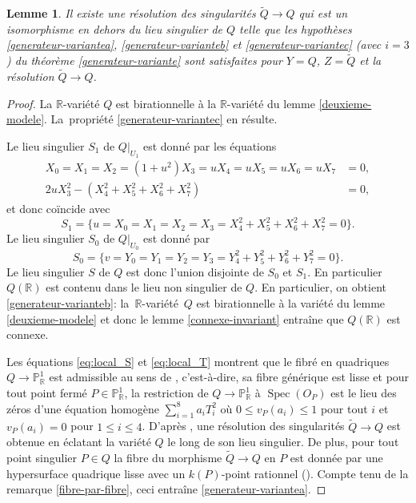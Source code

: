 \documentclass[JEP,XML,SOM,Unicode,francais,published]{cedram}
\newtheorem{lemma}[thm]{Lemme}
\theoremstyle{definition}
\newcommand{\R}{\mathbb R}
\renewcommand{\P}{\mathbb P}
\newcommand{\Spec}{\operatorname{Spec}}
\begin{document}
\begin{lemma}\label{fibration-quadriques-a-c}
Il existe une résolution des singularités $\tilde{Q}\to Q$ qui est un isomorphisme en dehors du lieu singulier de $Q$ telle que les hypothèses \eqref{generateur-variantea}, \eqref{generateur-varianteb} et \eqref{generateur-variantec} (avec $i=3$) du théorème \ref{generateur-variante} sont satisfaites pour $Y=Q$, $Z=\tilde{Q}$ et la résolution $\tilde{Q}\to Q$.
\end{lemma}

\begin{proof}
La $\R$-variété $Q$ est birationnelle à la $\R$-variété du lemme \ref{deuxieme-modele}. La~propriété \eqref{generateur-variantec} en résulte.

Le lieu singulier $S_1$ de $Q|_{U_1}$ est donné par les équations
\begin{align*}
X_0=X_1=X_2=(1+u^2)X_3=uX_4=uX_5=uX_6=uX_7&=0, \\
2uX_3^2-(X_4^2+X_5^2+X_6^2+X_7^2)&=0,
\end{align*}
et donc coïncide avec
\[S_1=\{u=X_0=X_1=X_2=X_3=X_4^2+X_5^2+X_6^2+X_7^2=0\}.\]
Le lieu singulier $S_0$ de $Q|_{U_0}$ est donné par
\[S_0=\{v=Y_0=Y_1=Y_2=Y_3=Y_4^2+Y_5^2+Y_6^2+Y_7^2=0\}.\]
Le lieu singulier $S$ de $Q$ est donc l'union disjointe de $S_0$ et $S_1$. En particulier $Q(\R)$ est contenu dans le lieu non singulier de $Q$. En particulier, on obtient \eqref{generateur-varianteb}: la~$\R$\nobreakdash-variété~$Q$ est birationnelle à la variété du lemme \ref{deuxieme-modele} et donc le lemme \ref{connexe-invariant} entraîne que $Q(\R)$ est connexe.

Les équations \eqref{eq:local_S} et \eqref{eq:local_T} montrent que le fibré en quadriques $Q\to \P^1_\R$ est admissible au sens de \cite[Déf.\,3.1]{colliot1993groupe}, c'est-à-dire, sa fibre générique est lisse et pour tout point fermé $P\in \P^1_\R$, la restriction de $Q\to \P^1_\R$ à $\Spec(O_P)$ est le lieu des zéros d'une équation homogène $\sum_{i=1}^8 a_iT_i^2$ où $0\leq v_P(a_i)\leq 1$ pour tout $i$ et $v_P(a_i)=0$ pour $1\leq i\leq 4$. D'après \cite[Th.\,3.3(a)]{colliot1993groupe}, une résolution des singularités $\tilde{Q}\to Q$ est obtenue en éclatant la variété $Q$ le long de son lieu singulier. De plus, pour tout point singulier $P\in Q$ la fibre du morphisme $\tilde{Q}\to Q$ en $P$ est donnée par une hypersurface quadrique lisse avec un $k(P)$-point rationnel (\cf \cite[bas de p.\,488]{colliot1993groupe}). Compte tenu de la remarque \ref{fibre-par-fibre}, ceci entraîne \eqref{generateur-variantea}.
\end{proof}
\end{document}
